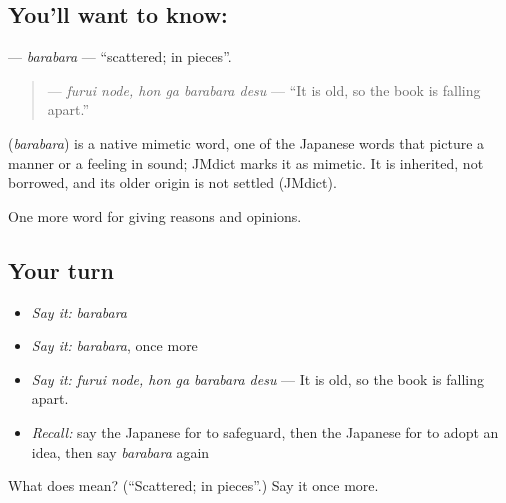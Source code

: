 \subsection*{You'll want to know: }
\textbf{} — \emph{barabara} — \textquotedblleft{}scattered; in pieces\textquotedblright{}.

\begin{quote}
\textbf{ } — \emph{furui node, hon ga barabara desu} — \textquotedblleft{}It is old, so the book is falling apart.\textquotedblright{}
\end{quote}

\begin{cousinweb}
\textbf{} (\emph{barabara}) is a native mimetic word, one of the Japanese words that picture a manner or a feeling in sound; JMdict marks it as mimetic. It is inherited, not borrowed, and its older origin is not settled (JMdict).
\end{cousinweb}

\begin{grammarlens}[title={What you've built}]
One more word for giving reasons and opinions.
\end{grammarlens}

\subsection*{Your turn}
\begin{itemize}
\raggedright
  \item \emph{Say it:} \emph{barabara}
  \item \emph{Say it:} \emph{barabara}, once more
  \item \emph{Say it:} \emph{furui node, hon ga barabara desu} — It is old, so the book is falling apart.
  \item \emph{Recall:} say the Japanese for to safeguard, then the Japanese for to adopt an idea, then say \emph{barabara} again
\end{itemize}

\begin{tcolorbox}[breakable,colback=teal!4,colframe=teal!35!black,title={Before you move on}]
What does  mean? (\textquotedblleft{}Scattered; in pieces\textquotedblright{}.) Say it once more.
\end{tcolorbox}
